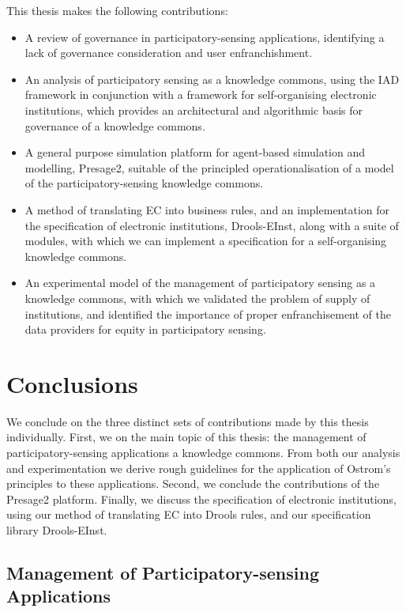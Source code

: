 This thesis makes the following contributions:

\begin{itemize}
\item A review of governance in participatory-sensing applications, identifying a lack of governance consideration and user enfranchishment.
\item An analysis of participatory sensing as a knowledge commons, using the \ac{IAD} framework in conjunction with a framework for self-organising electronic institutions, which provides an architectural and algorithmic basis for governance of a knowledge commons.
\item A general purpose simulation platform for agent-based simulation and modelling, Presage2, suitable of the principled operationalisation of a model of the participatory-sensing knowledge commons.
\item A method of translating \acl{EC} into business rules, and an implementation for the specification of electronic institutions, Drools-EInst, along with a suite of modules, with which we can implement a specification for a self-organising knowledge commons.
\item An experimental model of the management of participatory sensing as a knowledge commons, with which we validated the problem of supply of institutions, and identified the importance of proper enfranchisement of the data providers for equity in participatory sensing.
\end{itemize}

\section{Conclusions}

We conclude on the three distinct sets of contributions made by this thesis
individually. First, we on the main topic of this thesis: the management of
participatory-sensing applications a knowledge commons. From both our analysis
and experimentation we derive rough guidelines for the application of Ostrom's
principles to these applications. Second, we conclude the contributions of the
Presage2 platform. Finally, we discuss the specification of electronic
institutions, using our method of translating \ac{EC} into Drools rules, and
our specification library Drools-EInst.

\subsection{Management of Participatory-sensing Applications}

